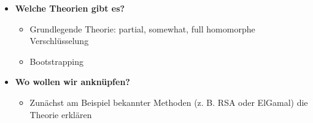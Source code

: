 \label{sec:praxis}
\begin{itemize}
    \item \textbf{Welche Theorien gibt es?}
    \begin{itemize}
        \item Grundlegende Theorie: partial, somewhat, full homomorphe Verschlüsselung
        \item Bootstrapping
    \end{itemize}

    \item \textbf{Wo wollen wir anknüpfen?}
    \begin{itemize}
        \item Zunächst am Beispiel bekannter Methoden (z. B. RSA oder ElGamal) die Theorie erklären
    \end{itemize}
\end{itemize}